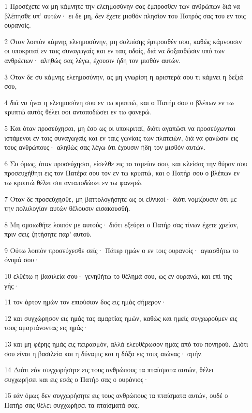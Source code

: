 \par 1 Προσέχετε να μη κάμνητε την ελεημοσύνην σας έμπροσθεν των ανθρώπων διά να βλέπησθε υπ' αυτών· ει δε μη, δεν έχετε μισθόν πλησίον του Πατρός σας του εν τοις ουρανοίς.
\par 2 Όταν λοιπόν κάμνης ελεημοσύνην, μη σαλπίσης έμπροσθέν σου, καθώς κάμνουσιν οι υποκριταί εν ταις συναγωγαίς και εν ταις οδοίς, διά να δοξασθώσιν υπό των ανθρώπων· αληθώς σας λέγω, έχουσιν ήδη τον μισθόν αυτών.
\par 3 Όταν δε συ κάμνης ελεημοσύνην, ας μη γνωρίση η αριστερά σου τι κάμνει η δεξιά σου,
\par 4 διά να ήναι η ελεημοσύνη σου εν τω κρυπτώ, και ο Πατήρ σου ο βλέπων εν τω κρυπτώ αυτός θέλει σοι ανταποδώσει εν τω φανερώ.
\par 5 Και όταν προσεύχησαι, μη έσο ως οι υποκριταί, διότι αγαπώσι να προσεύχωνται ιστάμενοι εν ταις συναγωγαίς και εν ταις γωνίαις των πλατειών, διά να φανώσιν εις τους ανθρώπους· αληθώς σας λέγω ότι έχουσιν ήδη τον μισθόν αυτών.
\par 6 Συ όμως, όταν προσεύχησαι, είσελθε εις το ταμείον σου, και κλείσας την θύραν σου προσευχήθητι εις τον Πατέρα σου τον εν τω κρυπτώ, και ο Πατήρ σου ο βλέπων εν τω κρυπτώ θέλει σοι ανταποδώσει εν τω φανερώ.
\par 7 Όταν δε προσεύχησθε, μη βαττολογήσητε ως οι εθνικοί· διότι νομίζουσιν ότι με την πολυλογίαν αυτών θέλουσιν εισακουσθή.
\par 8 Μη ομοιωθήτε λοιπόν με αυτούς· διότι εξεύρει ο Πατήρ σας τίνων έχετε χρείαν, πριν σεις ζητήσητε παρ' αυτού.
\par 9 Ούτω λοιπόν προσεύχεσθε σείς· Πάτερ ημών ο εν τοις ουρανοίς· αγιασθήτω το όνομά σου·
\par 10 ελθέτω η βασιλεία σου· γενηθήτω το θέλημά σου, ως εν ουρανώ, και επί της γής·
\par 11 τον άρτον ημών τον επιούσιον δος εις ημάς σήμερον·
\par 12 και συγχώρησον εις ημάς τας αμαρτίας ημών, καθώς και ημείς συγχωρούμεν εις τους αμαρτάνοντας εις ημάς·
\par 13 και μη φέρης ημάς εις πειρασμόν, αλλά ελευθέρωσον ημάς από του πονηρού. Διότι σου είναι η βασιλεία και η δύναμις και η δόξα εις τους αιώνας· αμήν.
\par 14 Διότι εάν συγχωρήσητε εις τους ανθρώπους τα πταίσματα αυτών, θέλει συγχωρήσει και εις εσάς ο Πατήρ σας ο ουράνιος·
\par 15 εάν όμως δεν συγχωρήσητε εις τους ανθρώπους τα πταίσματα αυτών, ουδέ ο Πατήρ σας θέλει συγχωρήσει τα πταίσματά σας.
